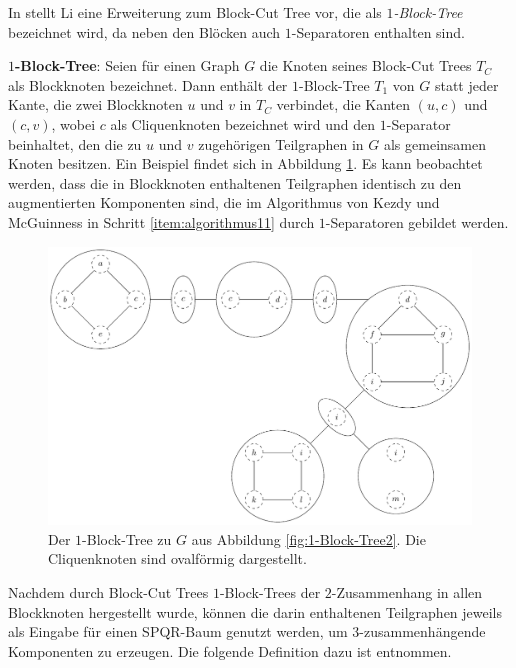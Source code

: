 In \cite{Li11} stellt Li eine Erweiterung zum Block-Cut Tree vor, die als \textit{$1$-Block-Tree} bezeichnet wird, da neben den Blöcken auch $1$-Separatoren enthalten sind.

\textbf{$1$-Block-Tree}: Seien für einen Graph $G$ die Knoten seines Block-Cut Trees $T_C$ als Blockknoten bezeichnet.
Dann enthält der $1$-Block-Tree $T_1$ von $G$ statt jeder Kante, die zwei Blockknoten $u$ und $v$ in $T_C$ verbindet, die Kanten $(u, c)$ und $(c, v)$, wobei $c$ als Cliquenknoten bezeichnet wird und den $1$-Separator beinhaltet, den die zu $u$ und $v$ zugehörigen Teilgraphen in $G$ als gemeinsamen Knoten besitzen.
Ein Beispiel findet sich in Abbildung \ref{fig:1-Block-Tree3}.
Es kann beobachtet werden, dass die in Blockknoten enthaltenen Teilgraphen identisch zu den augmentierten Komponenten sind, die im Algorithmus von Kezdy und McGuinness in Schritt \ref{item:algorithmus11} durch $1$-Separatoren gebildet werden.
\begin{figure}[H]
  \centering
  \includegraphics[width=\textwidth,height=\textheight,keepaspectratio]{bilder/1-Block-Tree3.pdf}
  \caption{Der $1$-Block-Tree zu $G$ aus Abbildung \ref{fig:1-Block-Tree2}.
           Die Cliquenknoten sind ovalförmig dargestellt.}
  \label{fig:1-Block-Tree3}
\end{figure}


Nachdem durch Block-Cut Trees \bzw $1$-Block-Trees der $2$-Zusammenhang in allen Blockknoten hergestellt wurde, können die darin enthaltenen Teilgraphen jeweils als Eingabe für einen SPQR-Baum genutzt werden, um $3$-zusammenhängende Komponenten zu erzeugen.
Die folgende Definition dazu ist \cite{GuM00} entnommen.

